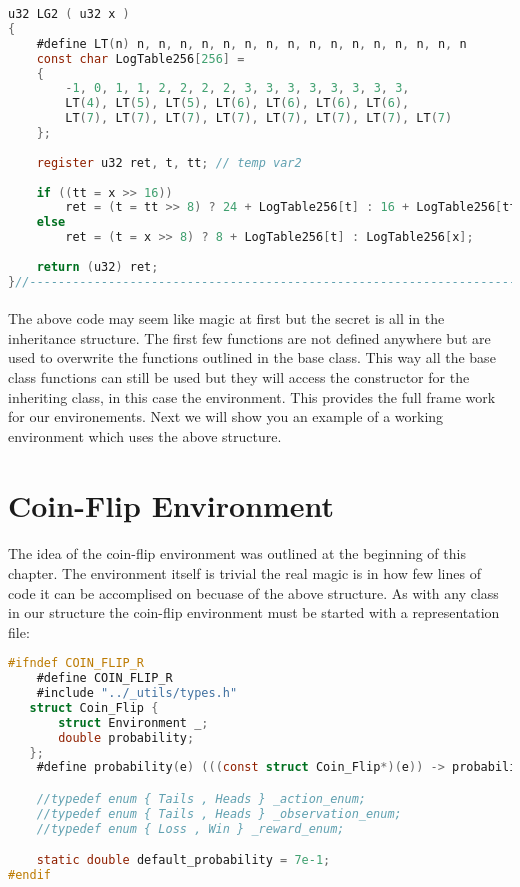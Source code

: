 \documentclass[fancychapters]{report}   	%
\begin{document}
\begin{lstlisting}[language=C,caption={environment.c}]
u32 LG2 ( u32 x )
{
    #define LT(n) n, n, n, n, n, n, n, n, n, n, n, n, n, n, n, n
    const char LogTable256[256] =
    {
        -1, 0, 1, 1, 2, 2, 2, 2, 3, 3, 3, 3, 3, 3, 3, 3,
        LT(4), LT(5), LT(5), LT(6), LT(6), LT(6), LT(6),
        LT(7), LT(7), LT(7), LT(7), LT(7), LT(7), LT(7), LT(7)
    };
    
    register u32 ret, t, tt; // temp var2
    
    if ((tt = x >> 16))
        ret = (t = tt >> 8) ? 24 + LogTable256[t] : 16 + LogTable256[tt];
    else
        ret = (t = x >> 8) ? 8 + LogTable256[t] : LogTable256[x];
    
    return (u32) ret;
}//--------------------------------------------------------------------

\end{lstlisting} 
\paragraph{}The above code may seem like magic at first but the secret is all in the inheritance structure.  The first few functions are not defined anywhere but are used to overwrite the functions outlined in the base class.  This way all the base class functions can still be used but they will access the constructor for the inheriting class, in this case the environment. This provides the full frame work for our environements.  Next we will show you an example of a working environment which uses the above structure. 
\section{Coin-Flip Environment}
\paragraph{} The idea of the coin-flip environment was outlined at the beginning of this chapter.  The environment itself is trivial the real magic is in how few lines of code it can be accomplised on becuase of the above structure.  As with any class in our structure the coin-flip environment must be started with a representation file:
\begin{lstlisting}[language=C,caption={coin_flip.r}]
#ifndef COIN_FLIP_R
    #define COIN_FLIP_R
    #include "../_utils/types.h"
   struct Coin_Flip {
       struct Environment _;
       double probability;       
   };
    #define probability(e) (((const struct Coin_Flip*)(e)) -> probability)

    //typedef enum { Tails , Heads } _action_enum;
    //typedef enum { Tails , Heads } _observation_enum;
    //typedef enum { Loss , Win } _reward_enum;

    static double default_probability = 7e-1;
#endif
\end{lstlisting} 
\end{document}
